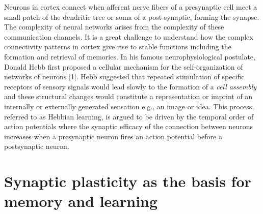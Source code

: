 \documentclass{ucetd}
\begin{document}
Neurons in cortex connect when afferent nerve fibers of a presynaptic cell meet a small patch of the dendritic tree or soma of a post-synaptic, forming the synapse. The complexity of neural networks arises from the complexity of these communication channels. It is a great challenge to understand how the complex connectivity patterns in cortex give rise to stable functions including the formation and retrieval of memories. In his famous neurophysiological postulate, Donald Hebb first proposed a cellular mechanism for the self-organization of networks of neurons [1]. Hebb suggested that repeated stimulation of specific receptors of sensory signals would lead slowly to the formation of a \emph{cell assembly} and these structural changes would constitute a representation or imprint of an internally or externally generated sensation e.g., an image or idea. This process, referred to as Hebbian learning, is argued to be driven by the temporal order of action potentials where the synaptic efficacy of the connection between neurons increases when a presynaptic neuron fires an action potential before a postsynaptic neuron.

\section{Synaptic plasticity as the basis for memory and learning}
\end{document}
